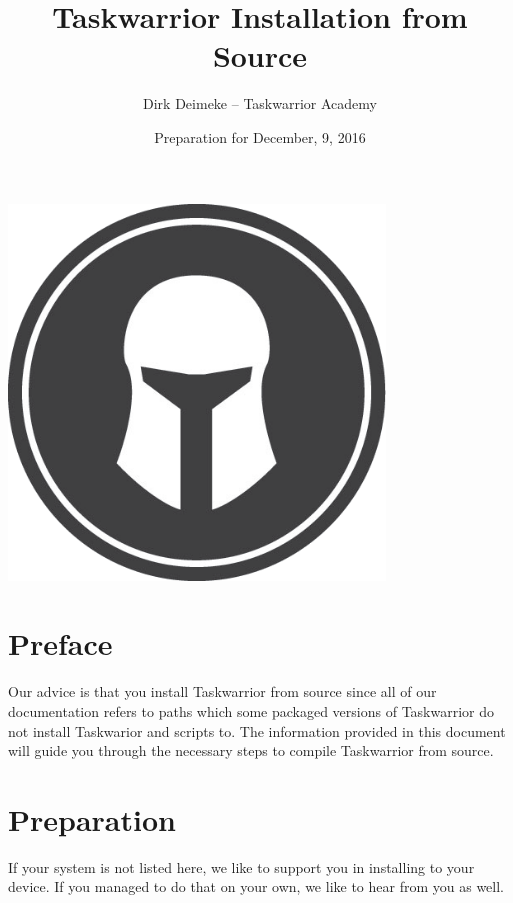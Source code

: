 \documentclass[DIV=12,fontsize=12pt,parskip=half,paper=portrait,%
               headheight=61pt,headinclude=yes,%
               footheight=15pt,footinclude=no]{scrartcl}
\title{Taskwarrior Installation from Source}
\date{Preparation for December, 9, 2016}
\author{Dirk Deimeke -- Taskwarrior Academy}
\begin{document}
\maketitle

\begin{center}
    \includegraphics[width=10cm]{tw-xl.png}
\end{center}

\newpage

\tableofcontents

\section{Preface}

Our advice is that you install Taskwarrior from source since all of our documentation refers to paths which some packaged versions of Taskwarrior do not install Taskwarior and scripts to. The information provided in this document will guide you through the necessary steps to compile Taskwarrior from source.

\section{Preparation}

If your system is not listed here, we like to support you in installing to your device. If you managed to do that on your own, we like to hear from you as well.
\end{document}
